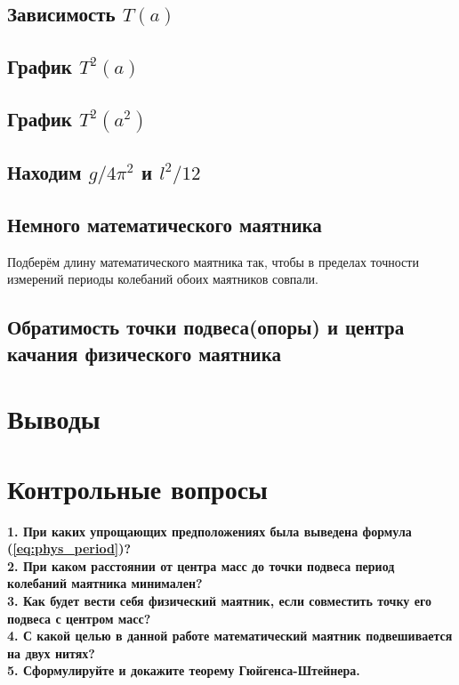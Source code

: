 \documentclass[13pt,a4paper]{article}
\begin{document}
\subsection{Зависимость $T(a)$}


\subsection{График $T^2(a)$}


\subsection{График $T^2(a^2)$}


\subsection{Находим $g/4\pi^2$ и $l^2/12$}


\subsection{Немного математического маятника}
Подберём длину математического маятника так, чтобы в пределах точности измерений периоды колебаний обоих маятников совпали.

\subsection{Обратимость точки подвеса(опоры) и центра качания физического маятника}


\section{Выводы}


\section{Контрольные вопросы}

\textbf{1. При каких упрощающих предположениях была выведена формула (\ref{eq:phys_period})?}\\
\textbf{2. При каком расстоянии от центра масс до точки подвеса период колебаний маятника минимален?}\\
\textbf{3. Как будет вести себя физический маятник, если совместить точку его подвеса с центром масс?}\\
\textbf{4. С какой целью в данной работе математический маятник подвешивается на двух нитях?}\\
\textbf{5. Сформулируйте и докажите теорему Гюйгенса-Штейнера.}
\end{document}
